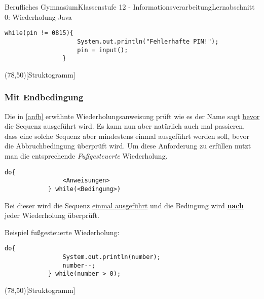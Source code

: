 \documentclass[11pt,oneside,openany,headings=optiontotoc,11pt,numbers=noenddot]{article}
\begin{document}
\begin{worksheet}{Berufliches Gymnasium}{Klassenstufe 12 - Informationsverarbeitung}{Lernabschnitt 0: Wiederholung Java}
\begin{minipage}[t]{0.48\textwidth}
\begin{lstlisting}[style=JavaInputStyle,frame=single]
				while(pin != 0815){
					System.out.println("Fehlerhafte PIN!");
					pin = input();
				}
			\end{lstlisting}
		\end{minipage}
		\hfill
		\begin{minipage}[t]{0.48\textwidth}
			\vspace*{0pt}
			\begin{struktogramm}(78,50)[Struktogramm]
				\whileend
			\end{struktogramm}
		\end{minipage}
		\subsubsection{Mit Endbedingung}
		Die in \ref{anfb} erwähnte Wiederholungsanweisung prüft wie es der Name sagt \underline{bevor} die Sequenz ausgeführt wird. Es kann nun aber natürlich auch mal passieren, dass eine solche Sequenz aber mindestens einmal ausgeführt werden soll, bevor die Abbruchbedingung überprüft wird. Um diese Anforderung zu erfüllen nutzt man die entsprechende \textit{Fußgesteuerte} Wiederholung.\\
		\begin{lstlisting}[style=JavaInputStyle]
			do{
				<Anweisungen>
			} while(<Bedingung>)
		\end{lstlisting}
		\par\noindent
		Bei dieser wird die Sequenz \underline{einmal ausgeführt} und die Bedingung wird \textbf{\underline{nach}} jeder Wiederholung überprüft.\\
		\par\noindent
		\begin{minipage}[t]{0.48\textwidth}
			\vspace*{0pt}
			Beispiel fußgesteuerte Wiederholung:
			\begin{lstlisting}[style=JavaInputStyle,frame=single]
			do{
				System.out.println(number);
				number--;
			} while(number > 0);
			\end{lstlisting}
		\end{minipage}
		\hfill
		\begin{minipage}[t]{0.48\textwidth}
			\vspace*{0pt}
			\begin{struktogramm}(78,50)[Struktogramm]
				\untilend
			\end{struktogramm}
		\end{minipage}
	\end{worksheet}
\end{document}
